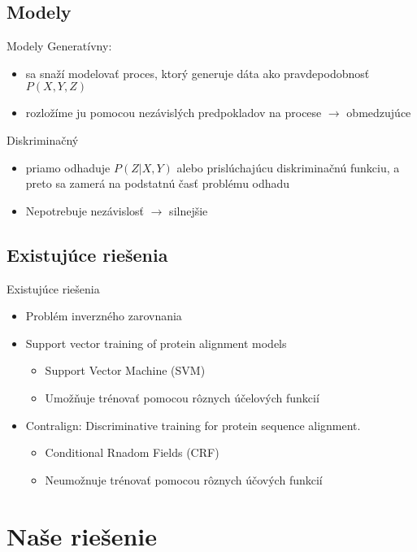 \documentclass[xcolor=dvipsnames, compress, 12pt]{beamer}
\begin{document}
\subsection{Modely}
\begin{frame}{Modely}
Generatívny:
\begin{itemize}
\item sa snaží modelovať proces, ktorý generuje dáta ako pravdepodobnosť $P(X,Y,Z)$
\item rozložíme ju pomocou nezávislých predpokladov na procese $\longrightarrow$ obmedzujúce
\end{itemize} 
\pause
Diskriminačný
\begin{itemize}
\item priamo odhaduje $P(Z|X,Y)$ alebo prislúchajúcu diskriminačnú funkciu, a preto sa zamerá na podstatnú časť problému odhadu
\item Nepotrebuje nezávislosť $\longrightarrow$ silnejšie
\end{itemize}   
\end{frame}


\subsection{Existujúce riešenia}
\begin{frame}{Existujúce riešenia}
  \begin{itemize}
    \item Problém inverzného zarovnania
    \pause
    \item Support vector training of protein alignment models
    \begin{itemize}
      \item Support Vector Machine (SVM)
      \item Umožňuje trénovať pomocou rôznych účelových funkcií
    \end{itemize}
    \pause
    \item Contralign: Discriminative training for protein sequence alignment.
    \begin{itemize}
      \item Conditional Rnadom Fields (CRF)
      \item Neumožnuje trénovať pomocou rôznych účových funkcií    
    \end{itemize}
  \end{itemize} 
\end{frame}

\section{Naše riešenie}
\end{document}

